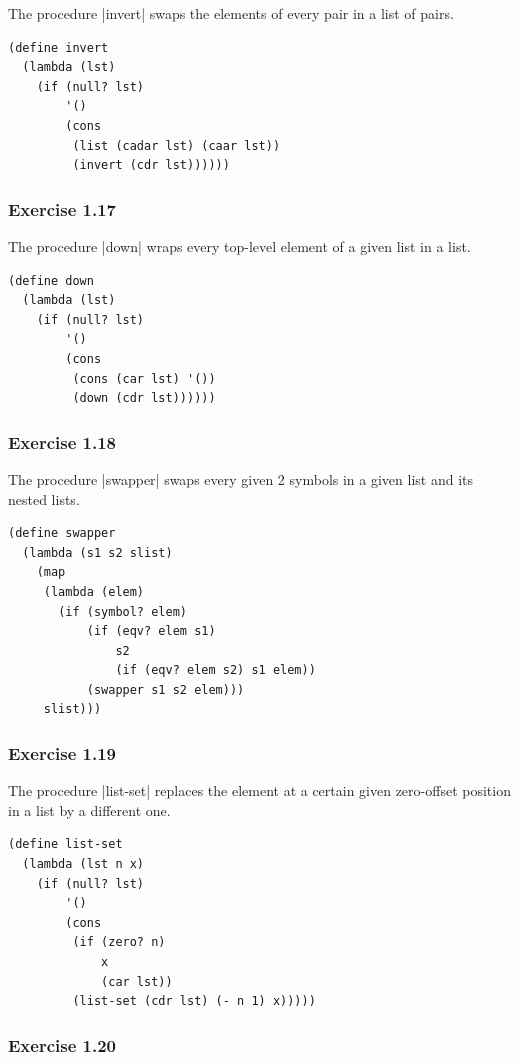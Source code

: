 \documentclass[a4paper]{article}
\begin{document}
The procedure |invert| swaps the elements of every pair in a list of pairs.

\begin{lstlisting}
(define invert
  (lambda (lst)
    (if (null? lst)
        '()
        (cons
         (list (cadar lst) (caar lst))
         (invert (cdr lst))))))
\end{lstlisting}

\subsubsection{Exercise 1.17}

The procedure |down| wraps every top-level element of a given list in a list.

\begin{lstlisting}
(define down
  (lambda (lst)
    (if (null? lst)
        '()
        (cons
         (cons (car lst) '())
         (down (cdr lst))))))
\end{lstlisting}

\subsubsection{Exercise 1.18}

The procedure |swapper| swaps every given 2 symbols in a given list and its nested lists.

\begin{lstlisting}
(define swapper
  (lambda (s1 s2 slist)
    (map
     (lambda (elem)
       (if (symbol? elem)
           (if (eqv? elem s1)
               s2
               (if (eqv? elem s2) s1 elem))
           (swapper s1 s2 elem)))
     slist)))
\end{lstlisting}

\subsubsection{Exercise 1.19}

The procedure |list-set| replaces the element at a certain given zero-offset position in a list by a different one.

\begin{lstlisting}
(define list-set
  (lambda (lst n x)
    (if (null? lst)
        '()
        (cons
         (if (zero? n)
             x
             (car lst))
         (list-set (cdr lst) (- n 1) x)))))
\end{lstlisting}

\subsubsection{Exercise 1.20}
\end{document}
